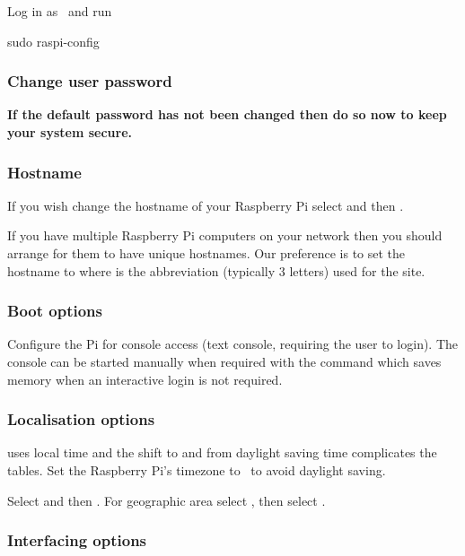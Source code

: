 Log in as \piUser\ and run
\begin{Cmd}
sudo raspi-config
\end{Cmd}

\subsubsection{Change user password}
\textbf{If the default password has not been changed then do so now to keep
your system secure.}

\subsubsection{Hostname} 
If you wish change the hostname of your Raspberry Pi select
 and then .

If you have multiple Raspberry Pi computers on your network then you
should arrange for them to have unique hostnames. Our preference is to
set the hostname to %
%
where  is the abbreviation (typically 3 letters) used for
the site.

\subsubsection{Boot options} 
Configure the Pi for console access (text console, requiring the user
to login). The console can be started manually when required with the
 command which saves memory when an interactive login
is not required.

\subsubsection{Localisation options}
 uses local time and the shift to and from daylight
saving time complicates the  tables. Set the Raspberry
Pi's timezone to \utc\ to avoid daylight saving.

Select  and
then . For geographic area select %
, then select \code{\utc}.

\subsubsection{Interfacing options}

